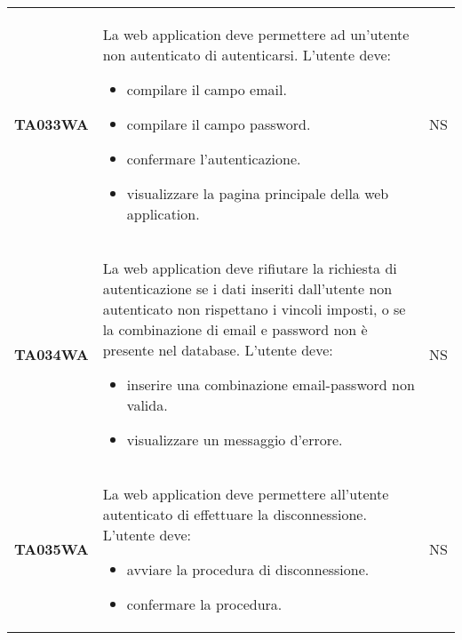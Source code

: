 \documentclass[../../piano-di-qualifica.tex]{subfiles}
\begin{document}
\begin{longtable}[H]{>{\centering\bfseries}m{3cm} >{}m{10cm} >{\centering\arraybackslash}m{3cm}}
  TA033WA           & La web application deve permettere ad un'utente non autenticato di autenticarsi. \newline
  L'utente deve:
  \begin{itemize}
    \item compilare il campo email.
    \item compilare il campo password.
    \item confermare l'autenticazione.
    \item visualizzare la pagina principale della web application.
  \end{itemize}
                    & NS                                                                                                                                                                                                                                                               \\
  TA034WA           & La web application deve rifiutare la richiesta di autenticazione se i dati inseriti dall'utente non autenticato non rispettano i vincoli imposti, o se la combinazione di email e password non è presente nel database. \newline
  L'utente deve:
  \begin{itemize}
    \item inserire una combinazione email-password non valida.
    \item visualizzare un messaggio d'errore.
  \end{itemize}
                    & NS                                                                                                                                                                                                                                                               \\
  TA035WA           & La web application deve permettere all'utente autenticato di effettuare la disconnessione. \newline
  L'utente deve:
  \begin{itemize}
    \item avviare la procedura di disconnessione.
    \item confermare la procedura.
  \end{itemize}
                    & NS                                                                                                                                                                                                                                                               \\

\end{longtable}
\end{document}
